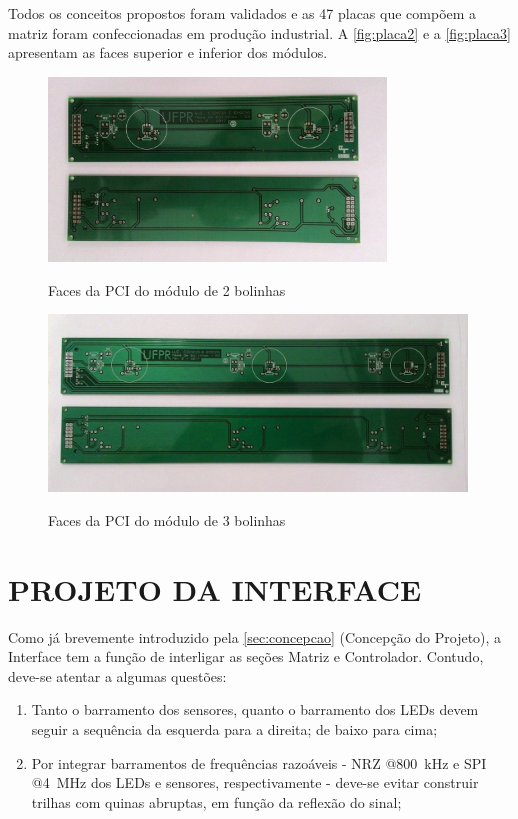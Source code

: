Todos os conceitos propostos foram validados e as 47 placas que compõem a matriz foram confeccionadas em produção industrial. A \autoref{fig:placa2} e a \autoref{fig:placa3} apresentam as faces superior e inferior dos módulos.

\begin{figure}[H]
    \centering
    \caption{Faces da PCI do módulo de 2 bolinhas}
    \includegraphics[width=0.8\textwidth]{./dados/figuras/bloco-2}
    \label{fig:placa2}
\end{figure}

\begin{figure}[H]
    \centering
    \caption{Faces da PCI do módulo de 3 bolinhas}
    \includegraphics[width=0.99\textwidth]{./dados/figuras/bloco-3}
    \label{fig:placa3}
\end{figure}

\section{PROJETO DA INTERFACE}
\label{sec:interface}

Como já brevemente introduzido pela \autoref{sec:concepcao} (Concepção do Projeto), a Interface tem a função de interligar as seções Matriz e Controlador. Contudo, deve-se atentar a algumas questões:

\begin{enumerate}[label=\Roman*.]
    \item Tanto o barramento dos sensores, quanto o barramento dos LEDs devem seguir a sequência da esquerda para a direita; de baixo para cima;
    \item Por integrar barramentos de frequências razoáveis - NRZ {@800\ kHz} e SPI {@4\ MHz} dos LEDs e sensores, respectivamente - deve-se evitar construir trilhas com quinas abruptas, em função da reflexão do sinal;
\end{enumerate}

